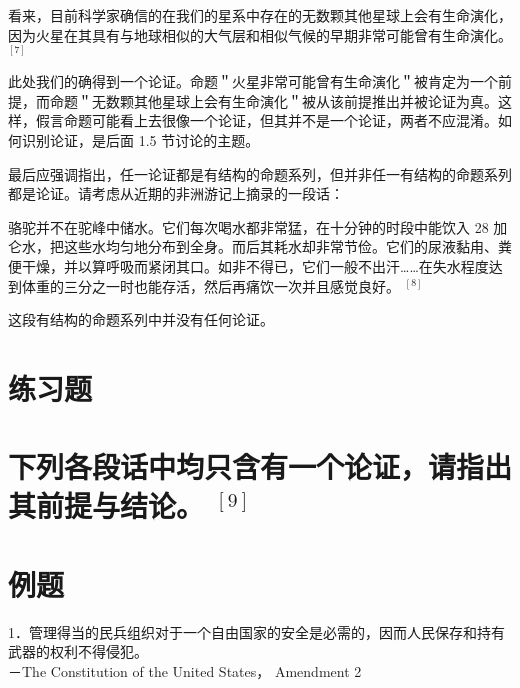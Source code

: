 看来，目前科学家确信的在我们的星系中存在的无数颗其他星球上会有生命演化，因为火星在其具有与地球相似的大气层和相似气候的早期非常可能曾有生命演化。 ${ }^{[7]}$

此处我们的确得到一个论证。命题＂火星非常可能曾有生命演化＂被肯定为一个前提，而命题＂无数颗其他星球上会有生命演化＂被从该前提推出并被论证为真。这样，假言命题可能看上去很像一个论证，但其并不是一个论证，两者不应混淆。如何识别论证，是后面 1.5 节讨论的主题。

最后应强调指出，任一论证都是有结构的命题系列，但并非任一有结构的命题系列都是论证。请考虑从近期的非洲游记上摘录的一段话：

\begin{displayquote}
骆驼并不在驼峰中储水。它们每次喝水都非常猛，在十分钟的时段中能饮入 28 加仑水，把这些水均匀地分布到全身。而后其耗水却非常节俭。它们的尿液黏甪、粪便干燥，并以算呼吸而紧闭其口。如非不得已，它们一般不出汗……在失水程度达到体重的三分之一时也能存活，然后再痛饮一次并且感觉良好。 ${ }^{[8]}$
\end{displayquote}

这段有结构的命题系列中并没有任何论证。

\section*{练习题}
\section*{下列各段话中均只含有一个论证，请指出其前提与结论。 ${ }^{[9]}$}
\section*{例题}
1．管理得当的民兵组织对于一个自由国家的安全是必需的，因而人民保存和持有武器的权利不得侵犯。\\
－The Constitution of the United States， Amendment 2

